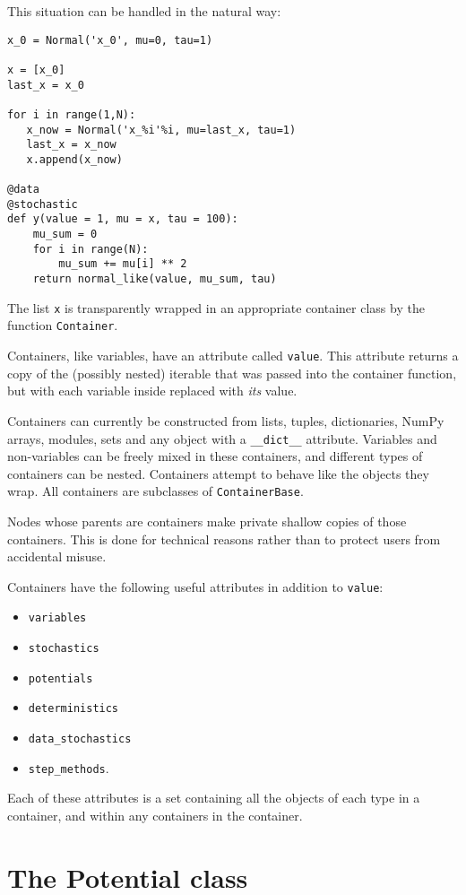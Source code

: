 This situation can be handled in the natural way:
\begin{verbatim}
x_0 = Normal('x_0', mu=0, tau=1)

x = [x_0]
last_x = x_0

for i in range(1,N):          
   x_now = Normal('x_%i'%i, mu=last_x, tau=1)        
   last_x = x_now 
   x.append(x_now)

@data
@stochastic
def y(value = 1, mu = x, tau = 100):
    mu_sum = 0
    for i in range(N):
        mu_sum += mu[i] ** 2
    return normal_like(value, mu_sum, tau)
\end{verbatim}
The list \texttt{x} is transparently wrapped in an appropriate container class by the function \texttt{Container}.

Containers, like variables, have an attribute called \texttt{value}. This attribute returns a copy of the (possibly nested) iterable that was passed into the container function, but with each variable inside replaced with \emph{its} value. 

Containers can currently be constructed from lists, tuples, dictionaries, NumPy arrays, modules, sets and any object with a \texttt{__dict__} attribute. Variables and non-variables can be freely mixed in these containers, and different types of containers can be nested. Containers attempt to behave like the objects they wrap. All containers are subclasses of \texttt{ContainerBase}. 

Nodes whose parents are containers make private shallow copies of those containers. This is done for technical reasons rather than to protect users from accidental misuse.

Containers have the following useful attributes in addition to \texttt{value}:
\begin{itemize}
    \item\texttt{variables}
    \item\texttt{stochastics}
    \item\texttt{potentials}
    \item\texttt{deterministics}
    \item\texttt{data_stochastics}
    \item\texttt{step_methods}.
\end{itemize}
Each of these attributes is a set containing all the objects of each type in a container, and within any containers in the container.


\hypertarget{potential}{}
\section*{The Potential class} \label{potential}

